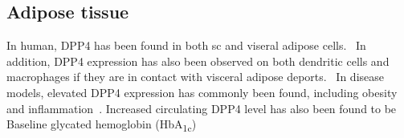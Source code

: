 \subsection{Adipose tissue}
In human, DPP4 has been found in both sc and viseral adipose cells.~\cite{Lamers2011} In addition, DPP4 expression has also been observed on both dendritic cells and macrophages if they are in contact with visceral adipose deports.~\cite{Zhong2013} In disease models, elevated DPP4 expression has commonly been found, including obesity and inflammation~\cite{Zhong2013}. Increased circulating DPP4 level has also been found to be   Baseline glycated hemoglobin (HbA\textsubscript{1c}) 